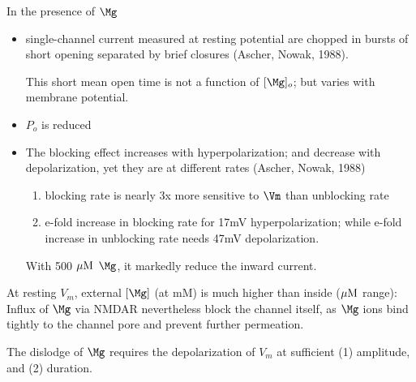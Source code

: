 In the presence of $\Mg$
\begin{itemize}
  
  \item single-channel current measured at resting potential are
  chopped in bursts of short opening separated by brief closures (Ascher,
  Nowak, 1988).
  
  This short mean open time is not a function of $[\Mg]_o$; but varies with
  membrane potential.
  
  \item $P_o$ is reduced

  \item The blocking effect increases with hyperpolarization; and decrease with
  depolarization, yet they are at different rates (Ascher, Nowak, 1988)
  \begin{enumerate}
    \item blocking rate is nearly 3x more sensitive to $\Vm$ than unblocking
    rate
    
    \item e-fold increase in blocking rate for 17mV hyperpolarization; while
    e-fold increase in unblocking rate needs 47mV depolarization.
  \end{enumerate}  
With 500 ${\mu\text{M}}$ $\Mg$, it markedly reduce the inward current. 
   
\end{itemize}

\begin{mdframed}

At resting $V_m$, external $[\Mg]$ (at mM) is much higher than inside
(${\mu\text{M}}$ range): Influx of $\Mg$ via NMDAR nevertheless block the channel
itself, as $\Mg$ ions bind tightly to the channel pore and prevent further
permeation.

The dislodge of $\Mg$ requires the depolarization of $V_m$ at sufficient (1)
amplitude, and (2) duration.

\end{mdframed}

